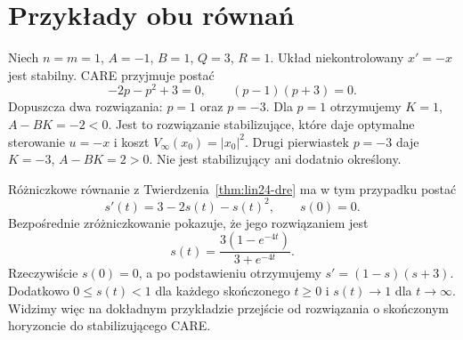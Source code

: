 \section{Przykłady obu równań}
\label{sec:lin24-examples}

\begin{przyklad}
\label{prz:lin24-care-scalar}
Niech \(n=m=1\),
\(A=-1\), \(B=1\),
\(Q=3\), \(R=1\).
Układ niekontrolowany
\(x'=-x\) jest stabilny.
CARE przyjmuje postać
\[
 -2p-p^2+3=0,
 \qquad
 (p-1)(p+3)=0.
\]
Dopuszcza dwa rozwiązania:
\(p=1\) oraz \(p=-3\).
Dla \(p=1\) otrzymujemy
\(K=1\), \(A-BK=-2<0\).
Jest to rozwiązanie
stabilizujące,
które daje optymalne
sterowanie \(u=-x\)
i koszt \(V_\infty(x_0)=|x_0|^2\).
Drugi pierwiastek
\(p=-3\) daje
\(K=-3\), \(A-BK=2>0\).
Nie jest stabilizujący
ani dodatnio określony.

Różniczkowe równanie
z Twierdzenia~\ref{thm:lin24-dre}
ma w tym przypadku postać
\[
 s'(t)=3-2s(t)-s(t)^2,
 \qquad s(0)=0.
\]
Bezpośrednie zróżniczkowanie
pokazuje, że jego rozwiązaniem jest
\[
 s(t)=
 \frac{3(1-e^{-4t})}{3+e^{-4t}}.
\]
Rzeczywiście \(s(0)=0\),
a po podstawieniu otrzymujemy
\(s'=(1-s)(s+3)\).
Dodatkowo \(0\le s(t)<1\)
dla każdego skończonego \(t\ge0\)
i \(s(t)\to1\) dla \(t\to\infty\).
Widzimy więc na dokładnym
przykładzie przejście
od rozwiązania o skończonym
horyzoncie do
stabilizującego CARE.
\end{przyklad}

